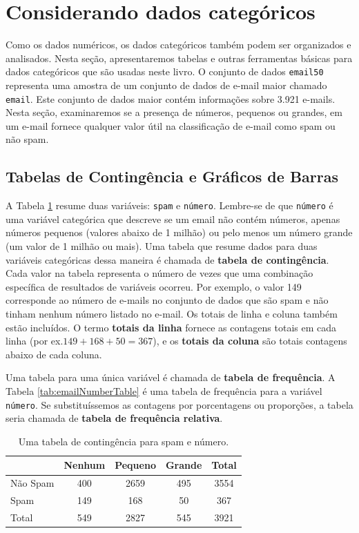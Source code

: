 \documentclass[
]{book}
\theoremstyle{definition}
\theoremstyle{definition}
\theoremstyle{definition}
\theoremstyle{definition}
\theoremstyle{remark}
\begin{document}
\hypertarget{categoricalData}{%
\section{Considerando dados categóricos}\label{categoricalData}}

Como os dados numéricos, os dados categóricos também podem ser organizados e analisados. Nesta seção, apresentaremos tabelas e outras ferramentas básicas para dados categóricos que são usadas neste livro. O conjunto de dados \texttt{email50} representa uma amostra de um conjunto de dados de e-mail maior chamado \texttt{email}. Este conjunto de dados maior contém informações sobre 3.921 e-mails. Nesta seção, examinaremos se a presença de números, pequenos ou grandes, em um e-mail fornece qualquer valor útil na classificação de e-mail como spam ou não spam.

\hypertarget{tablesBarGraphics}{%
\subsection{Tabelas de Contingência e Gráficos de Barras}\label{tablesBarGraphics}}

A Tabela \ref{tab:emailSpamNumberTableTotals} resume duas variáveis: \texttt{spam} e \texttt{número}. Lembre-se de que \texttt{número} é uma variável categórica que descreve se um email não contém números, apenas números pequenos (valores abaixo de 1 milhão) ou pelo menos um número grande (um valor de 1 milhão ou mais). Uma tabela que resume dados para duas variáveis categóricas dessa maneira é chamada de \textbf{tabela de contingência}. Cada valor na tabela representa o número de vezes que uma combinação específica de resultados de variáveis ocorreu. Por exemplo, o valor 149 corresponde ao número de e-mails no conjunto de dados que são spam e não tinham nenhum número listado no e-mail. Os totais de linha e coluna também estão incluídos. O termo \textbf{totais da linha} fornece as contagens totais em cada linha (por ex.\(149 + 168 + 50 = 367\)), e os \textbf{totais da coluna} são totais contagens abaixo de cada coluna.

Uma tabela para uma única variável é chamada de \textbf{tabela de frequência}. A Tabela \ref{tab:emailNumberTable} é uma tabela de frequência para a variável \texttt{número}. Se substituíssemos as contagens por porcentagens ou proporções, a tabela seria chamada de \textbf{tabela de frequência relativa}.

\begin{table}

\caption{\label{tab:emailSpamNumberTableTotals}Uma tabela de contingência para spam e número.}
\centering
\begin{tabular}[t]{l|c|c|c|c}
\hline
  & Nenhum & Pequeno & Grande & Total\\
\hline
Não Spam & 400 & 2659 & 495 & 3554\\
\hline
Spam & 149 & 168 & 50 & 367\\
\hline
Total & 549 & 2827 & 545 & 3921\\
\hline
\end{tabular}
\end{table}
\end{document}
